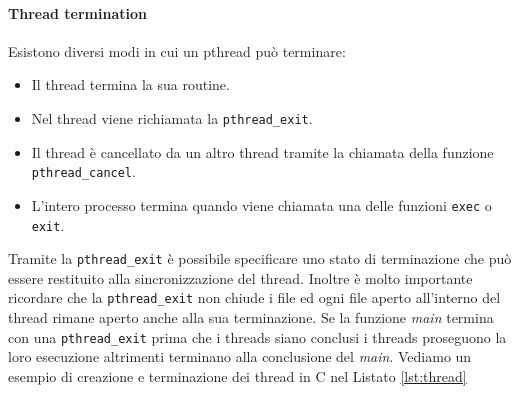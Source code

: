 \paragraph{Thread termination}
Esistono diversi modi in cui un pthread può terminare:
\begin{itemize}
\item Il thread termina la sua routine.
\item Nel thread viene richiamata la \texttt{pthread\_exit}.
\item Il thread è cancellato da un altro thread tramite la chiamata della funzione \texttt{pthread\_cancel}.
\item L'intero processo termina quando viene chiamata una delle funzioni \texttt{exec} o \texttt{exit}.
\end{itemize}
Tramite la \texttt{pthread\_exit} è possibile specificare uno stato di terminazione che può essere restituito alla sincronizzazione del thread. Inoltre è molto importante ricordare che la \texttt{pthread\_exit} non chiude i file ed ogni file aperto all'interno del thread rimane aperto anche alla sua terminazione.
Se la funzione \emph{main} termina con una \texttt{pthread\_exit} prima che i threads siano conclusi i threads proseguono la loro esecuzione altrimenti terminano alla conclusione del \emph{main}.
Vediamo un esempio di creazione e terminazione dei thread in C nel  Listato \ref{lst:thread}

